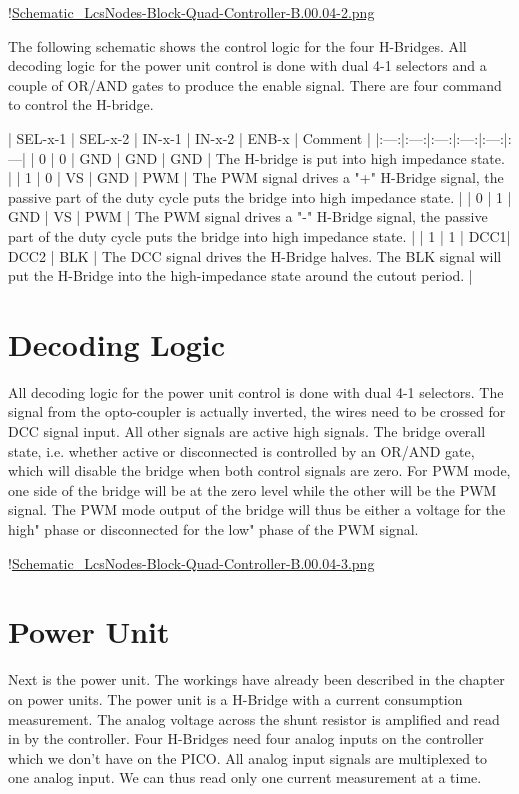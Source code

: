 !\href{./Schematics/Schematic_LcsNodes-Block-Quad-Controller-B.00.04-2.png }{Schematic_LcsNodes-Block-Quad-Controller-B.00.04-2.png}

The following schematic shows the control logic for the four H-Bridges. All decoding logic for the power unit control is done with dual 4-1 selectors and a couple of OR/AND gates to produce the enable signal. There are four command to control the H-bridge.

| SEL-x-1 | SEL-x-2 | IN-x-1 | IN-x-2 | ENB-x | Comment |
|:---:|:---:|:---:|:---:|:---:|:---|
| 0 | 0 | GND | GND | GND | The H-bridge is put into high impedance state. |
| 1 | 0 | VS | GND | PWM | The PWM signal drives a "+" H-Bridge signal, the passive part of the duty cycle puts the bridge into high impedance state. |
| 0 | 1 | GND | VS | PWM | The PWM signal drives a "-" H-Bridge signal, the passive part of the duty cycle puts the bridge into high impedance state. |
| 1 | 1 | DCC1| DCC2 | BLK | The DCC signal drives the H-Bridge halves. The BLK signal will put the H-Bridge into the high-impedance state around the cutout period. |

\section{Decoding Logic}

All decoding logic for the power unit control is done with dual 4-1 selectors. The signal from the opto-coupler is actually inverted, the wires need to be crossed for DCC signal input. All other signals are active high signals. The bridge overall state, i.e. whether active or disconnected is controlled by an OR/AND gate, which will disable the bridge when both control signals are zero. For PWM mode, one side of the bridge will be at the zero level while the other will be the PWM signal. The PWM mode output of the bridge will thus be either a voltage for the high" phase or disconnected for the low" phase of the PWM signal.

!\href{./Schematics/Schematic_LcsNodes-Block-Quad-Controller-B.00.04-3.png }{Schematic_LcsNodes-Block-Quad-Controller-B.00.04-3.png}

\section{Power Unit}

Next is the power unit. The workings have already been described in the chapter on power units. The power unit is a H-Bridge with a current consumption measurement. The analog voltage across the shunt resistor is amplified and read in by the controller. Four H-Bridges need four analog inputs on the controller which we don't have on the PICO. All analog input signals are multiplexed to one analog input. We can thus read only one current measurement at a time.

